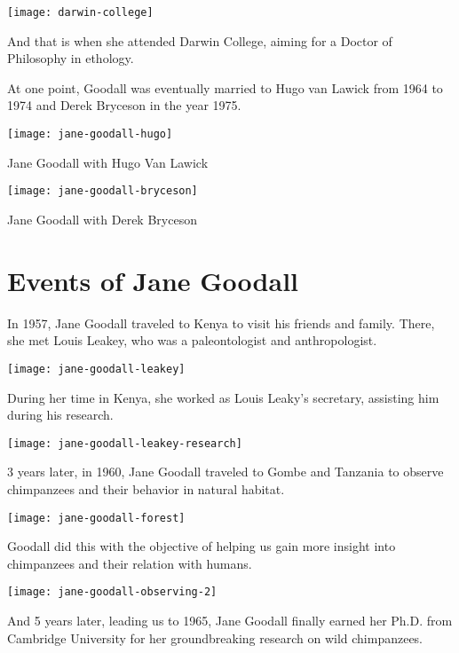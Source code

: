 \documentclass[12pt]{report}
\begin{document}
\texttt{[image: darwin-college]}

And that is when she attended Darwin College, aiming for a Doctor of Philosophy
in ethology.

\pagebreak

At one point, Goodall was eventually married to Hugo van Lawick from 1964 to
1974 and Derek Bryceson in the year 1975.

\texttt{[image: jane-goodall-hugo]}

Jane Goodall with Hugo Van Lawick

\texttt{[image: jane-goodall-bryceson]}

Jane Goodall with Derek Bryceson

\section*{Events of Jane Goodall}

In 1957, Jane Goodall traveled to Kenya to visit his friends and family. There,
she met Louis Leakey, who was a paleontologist and anthropologist.

\texttt{[image: jane-goodall-leakey]}

During her time in Kenya, she worked as Louis Leaky’s secretary, assisting him
during his research.

\texttt{[image: jane-goodall-leakey-research]}

\pagebreak

3 years later, in 1960, Jane Goodall traveled to Gombe and Tanzania to observe
chimpanzees and their behavior in natural habitat.

\texttt{[image: jane-goodall-forest]}

Goodall did this with the objective of helping us gain more insight into
chimpanzees and their relation with humans.

\texttt{[image: jane-goodall-observing-2]}

\pagebreak

And 5 years later, leading us to 1965, Jane Goodall finally earned her Ph.D.
from Cambridge University for her groundbreaking research on wild chimpanzees.
\end{document}
